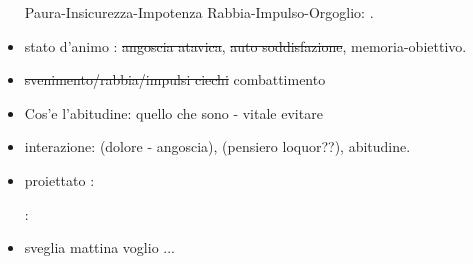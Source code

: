 \begin{itemize}
Paura-Insicurezza-Impotenza Rabbia-Impulso-Orgoglio: .

\item stato d’animo : \sout{angoscia atavica}, \sout{auto soddisfazione}, memoria-obiettivo.

\item \sout{svenimento/rabbia/impulsi ciechi} combattimento

\item Cos’e l’abitudine: quello che sono  - vitale evitare 

\item interazione:  (dolore - angoscia), (pensiero loquor??), abitudine.

\item proiettato :

: 

\item sveglia mattina voglio  ...  

\end{itemize}
